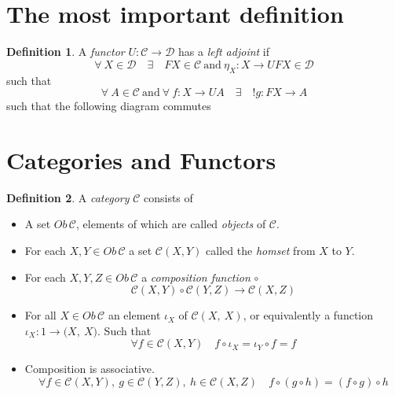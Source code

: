 \documentclass{article}
\theoremstyle{definition}
\newtheorem{definition}{Definition}[section]
\begin{document}
\section{The most important definition}
\begin{definition}
	A \textit{functor} $U : \mathcal{C} \rightarrow \mathcal{D}$ has a \textit{left adjoint} if
		$$
		\forall\ X \in \mathcal{D}
		\quad\exists\quad
		FX \in \mathcal{C} \ \textrm{and}\ \eta_X : X \rightarrow UFX \in \mathcal{D}
		$$
		such that
		$$
		\forall\ A \in \mathcal{C}\ \textrm{and}\ \forall\ f : X \rightarrow UA
		\quad\exists\quad
		!g : FX \rightarrow A
		$$
		such that the following diagram commutes
\end{definition}

\begin{center}
\end{center}

\section{Categories and Functors}

\begin{definition}
	A \textit{category} $\mathcal{C}$ consists of
	\begin{itemize}
		\item A set $Ob\,\mathcal{C}$, elements of which are called \textit{objects} of $\mathcal{C}$.
		\item For each $X, Y \in Ob\,\mathcal{C}$
			a set $\mathcal{C}(X,Y)$ called the \textit{homset} from $X$ to $Y$.
		\item For each $X, Y, Z \in Ob\,\mathcal{C}$ a \textit{composition function} $\circ$
			$$\mathcal{C}(X,Y) \circ \mathcal{C}(Y,Z) \rightarrow \mathcal{C}(X,Z)$$
		\item For all $X \in Ob\,\mathcal{C}$ an element $\iota_X$ of $\mathcal{C}(X,\ X)$,
			or equivalently a function $\iota_X : 1 \rightarrow \mathcal(X,\ X)$.
			Such that
			$$\forall f \in \mathcal{C}(X,Y)\quad f \circ \iota_X = \iota_Y \circ f = f$$
		\item Composition is associative.
			$$\forall
			f \in \mathcal{C}(X,Y),\ 
			g \in \mathcal{C}(Y,Z),\ 
			h \in \mathcal{C}(X,Z)\quad
			f \circ (g \circ h) = (f \circ g) \circ h
			$$
	\end{itemize}
\end{definition}
\end{document}
